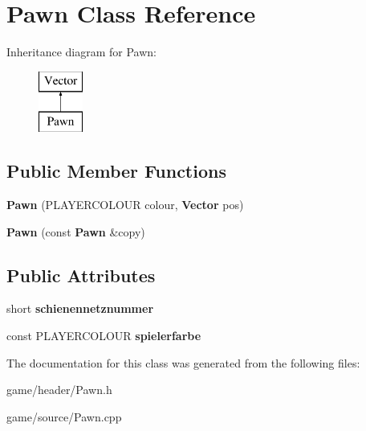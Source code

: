 \section{Pawn Class Reference}
\label{class_pawn}
Inheritance diagram for Pawn\-:\begin{figure}[H]
\begin{center}
\leavevmode
\includegraphics[height=2.000000cm]{class_pawn}
\end{center}
\end{figure}
\subsection*{Public Member Functions}
\begin{DoxyCompactItemize}
\item 
{\bfseries Pawn} (P\-L\-A\-Y\-E\-R\-C\-O\-L\-O\-U\-R colour, {\bf Vector} pos)\label{class_pawn_a0b393cf205a91f3ac07bdfbc14036fe2}

\item 
{\bfseries Pawn} (const {\bf Pawn} \&copy)\label{class_pawn_a512724e66a28f71702973bcd87bd883b}

\end{DoxyCompactItemize}
\subsection*{Public Attributes}
\begin{DoxyCompactItemize}
\item 
short {\bfseries schienennetznummer}\label{class_pawn_a8f02932d671c756305cbe3959104d5bf}

\item 
const P\-L\-A\-Y\-E\-R\-C\-O\-L\-O\-U\-R {\bfseries spielerfarbe}\label{class_pawn_afa1487b79a518e686b8334ae6467ae55}

\end{DoxyCompactItemize}


The documentation for this class was generated from the following files\-:\begin{DoxyCompactItemize}
\item 
game/header/Pawn.\-h\item 
game/source/Pawn.\-cpp\end{DoxyCompactItemize}
